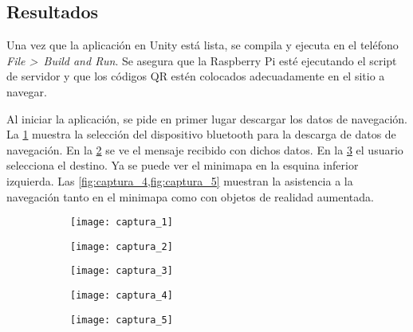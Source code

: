 \documentclass{article}
\newenvironment{standalone}{\begin{preview}}{\end{preview}}
\begin{document}
\begin{standalone}

  \section{Resultados}

  Una vez que la aplicación en Unity está lista, se compila y ejecuta en el teléfono \textit{File >\ Build and Run}.
  Se asegura que la Raspberry Pi esté ejecutando el script de servidor y que los códigos QR estén colocados adecuadamente en el sitio a navegar.

  Al iniciar la aplicación, se pide en primer lugar descargar los datos de navegación.
  La \cref{fig:captura_1} muestra la selección del dispositivo bluetooth para la descarga de datos de navegación.
  En la \cref{fig:captura_2} se ve el mensaje recibido con dichos datos.
  En la \cref{fig:captura_3} el usuario selecciona el destino.
  Ya se puede ver el minimapa en la esquina inferior izquierda.
  Las \cref{fig:captura_4,fig:captura_5} muestran la asistencia a la navegación tanto en el minimapa como con objetos de realidad aumentada.

  \begin{figure}[ht!]
    \centering
    \begin{subfigure}[b]{0.19\textwidth}
      \centering
      \texttt{[image: captura\_1]}
      \caption{}
      \label{fig:captura_1}
    \end{subfigure}
    \hfill
    \begin{subfigure}[b]{0.19\textwidth}
      \centering
      \texttt{[image: captura\_2]}
      \caption{}
      \label{fig:captura_2}
    \end{subfigure}
    \hfill
    \begin{subfigure}[b]{0.19\textwidth}
      \centering
      \texttt{[image: captura\_3]}
      \caption{}
      \label{fig:captura_3}
    \end{subfigure}
    \hfill
    \begin{subfigure}[b]{0.19\textwidth}
      \centering
      \texttt{[image: captura\_4]}
      \caption{}
      \label{fig:captura_4}
    \end{subfigure}
    \hfill
    \begin{subfigure}[b]{0.19\textwidth}
      \centering
      \texttt{[image: captura\_5]}
      \caption{}
      \label{fig:captura_5}
    \end{subfigure}
    \hfill


\end{figure}
\end{standalone}
\end{document}
